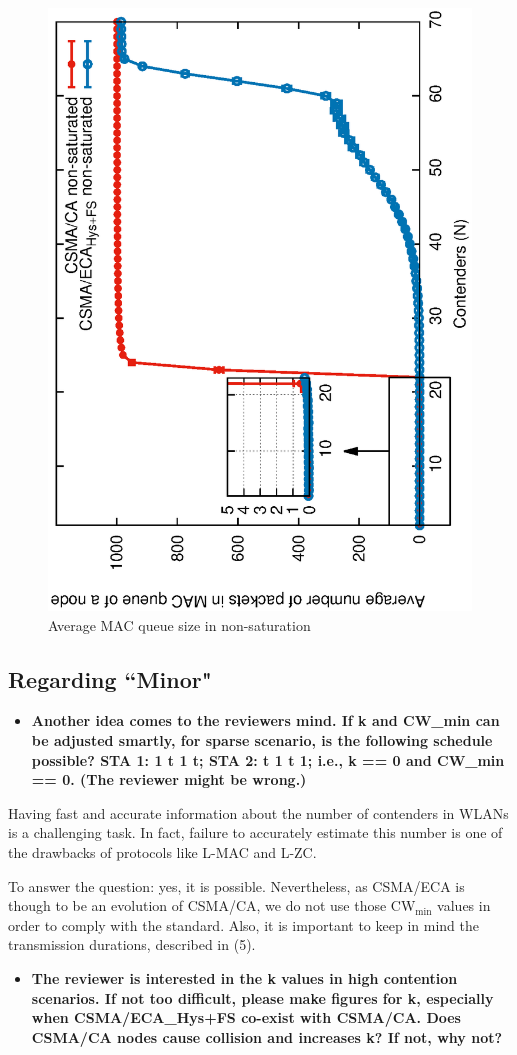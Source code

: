 \documentclass[]{article}
\begin{document}
		\begin{figure}[tb]
		\centering
			\includegraphics[width=0.45\linewidth,angle=-90]{figures/unsaturated/queueSize/queueSize-multiplot-TON.eps}
			\caption{Average MAC queue size in non-saturation}
			\label{fig:queueSize}
		\end{figure}
		
	\subsection{Regarding ``Minor"}
		\begin{itemize}
			\item {\bfseries Another idea comes to the reviewers mind. If k and CW\_min can be adjusted smartly, for sparse scenario, is the following schedule possible?
    					STA 1:  1   t   1   t;
     					STA 2:  t   1   t   1; 
			i.e., k == 0 and CW\_min == 0. (The reviewer might be wrong.)}
		\end{itemize}
		
		Having fast and accurate information about the number of contenders in WLANs is a challenging task. In fact, failure to accurately estimate this number is one of the drawbacks of protocols like L-MAC and L-ZC.
		
		To answer the question: yes, it is possible. Nevertheless, as CSMA/ECA is though to be an evolution of CSMA/CA, we do not use those CW$_{\min}$ values in order to comply with the standard. Also, it is important to keep in mind the transmission durations, described in (5).
		
		\begin{itemize}
			\item {\bfseries The reviewer is interested in the k values in high contention scenarios. If not too difficult, please make figures for k, especially when CSMA/ECA\_{Hys+FS} co-exist with CSMA/CA. Does CSMA/CA nodes cause collision and increases k? If not, why not?}
		\end{itemize}
		
\end{document}

